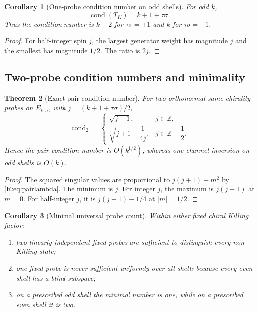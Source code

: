 \documentclass[
 aps,
 prd,
 reprint,
 amsmath,
 amssymb,
 nofootinbib,
 superscriptaddress
]{revtex4-2}
\newtheorem{theorem}{Theorem}[section]
\newtheorem{corollary}[theorem]{Corollary}
\theoremstyle{definition}
\theoremstyle{remark}
\begin{document}
\begin{corollary}[One-probe condition number on odd shells]
\label{R:cor:onecond}
For odd $k$,
\begin{equation}
 \boxed{
 \operatorname{cond}(T_K)
 =
 k+1+\tau\sigma.
 }
 \label{R:eq:onecond}
\end{equation}
Thus the condition number is $k+2$ for $\tau\sigma=+1$ and $k$ for
$\tau\sigma=-1$.
\end{corollary}

\begin{proof}
For half-integer spin $j$, the largest generator weight has magnitude $j$
and the smallest has magnitude $1/2$.  The ratio is $2j$.
\end{proof}

\subsection{Two-probe condition numbers and minimality}

\begin{theorem}[Exact pair condition number]
\label{R:thm:paircond}
For two orthonormal same-chirality probes on $E_{k,\sigma}$, with
$j=(k+1+\tau\sigma)/2$,
\begin{equation}
 \boxed{
 \operatorname{cond}_2
 =
 \begin{cases}
 \sqrt{j+1},&j\in\mathbb Z,\\[1ex]
 \sqrt{j+1-\dfrac{1}{4j}},
 &j\in\mathbb Z+\dfrac12.
 \end{cases}
 }
 \label{R:eq:paircond}
\end{equation}
Hence the pair condition number is $O(k^{1/2})$, whereas one-channel
inversion on odd shells is $O(k)$.
\end{theorem}

\begin{proof}
The squared singular values are proportional to
$j(j+1)-m^2$ by \eqref{R:eq:pairlambda}.  The minimum is $j$.
For integer $j$, the maximum is $j(j+1)$ at $m=0$.
For half-integer $j$, it is $j(j+1)-1/4$ at $|m|=1/2$.
\end{proof}

\begin{corollary}[Minimal universal probe count]
\label{R:cor:minimal}
Within either fixed chiral Killing factor:

\begin{enumerate}[label=(\roman*)]
\item two linearly independent fixed probes are sufficient to distinguish
every non-Killing state;

\item one fixed probe is never sufficient uniformly over all shells because
every even shell has a blind subspace;

\item on a prescribed odd shell the minimal number is one, while on a
prescribed even shell it is two.
\end{enumerate}
\end{corollary}
\end{document}
